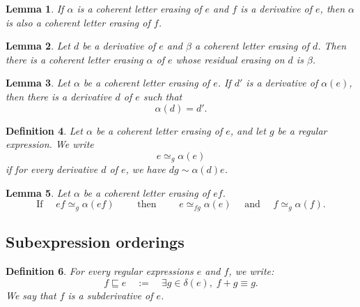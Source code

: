 \documentclass{article}
\newtheorem{definition}{Definition}[section]
\newtheorem{lemma}[definition]{Lemma}
\begin{document}
\begin{lemma}\label{lem:residual-erasing}
  If $\alpha$ is a coherent letter erasing of $e$ and $f$ is a derivative of
  $e$, then ${\alpha}$ is also a coherent letter erasing of $f$.
\end{lemma}


\begin{lemma}\label{lem:extend-residual-erasing}
  Let $d$ be a derivative of $e$ and $\beta$ a coherent letter erasing
  of $d$. Then there is a coherent letter erasing $\alpha$ of $e$ whose
  residual erasing on $d$ is $\beta$.
\end{lemma}


\begin{lemma}\label{lem:derivative-of-erasing}
  Let $\alpha$ be a coherent letter erasing of $e$. If $d'$ is a derivative of
  $\alpha(e)$, then there is a derivative $d$ of $e$ such that
  \[
   {\alpha}(d)=d'.
  \]
\end{lemma}

\begin{definition}
  Let $\alpha$ be a coherent letter erasing of $e$, and let $g$ be a regular
  expression. We write
  \[
    e\mathrel{\simeq_g}\alpha(e)
  \]
  if for every derivative $d$ of $e$, we have $dg\sim \alpha(d)e$.
\end{definition}




\begin{lemma}\label{lem:quiescent-factor-separation}
  Let $\alpha$ be a coherent letter erasing of $ef$.
  \[
  \text{If } \quad ef\mathrel{\simeq_g}\alpha(ef) \qquad \text{ then }\qquad  e\mathrel{\simeq_{fg}}\alpha(e)\quad  \text{ and }\quad f\mathrel{\simeq_g}\alpha(f).
  \]
\end{lemma}



\subsection{Subexpression orderings}

\begin{definition}
For every regular expressions $e$ and $f$, we write:
\[f \sqsubseteq e \quad := \quad
    \exists g\in\delta(e),\; f+g \equiv g.
    \]
    We say that $f$ is a \emph{subderivative} of $e$.
\end{definition}
\end{document}
